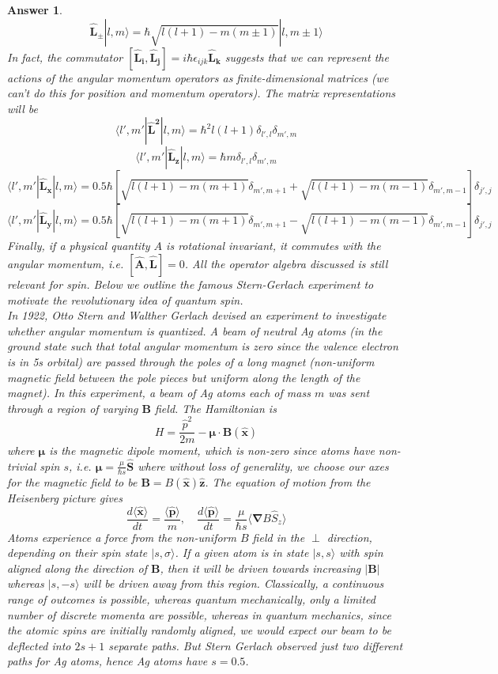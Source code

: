 \documentclass[a4paper]{article}
\newtheorem{ans}{Answer}[subsection]
\theoremstyle{new}
\begin{document}
\begin{ans}
$$\mathbf{\hat{L}_\pm}|l,m\rangle=\hbar\sqrt{l(l+1)-m(m\pm1)}|l,m\pm1\rangle$$
In fact, the commutator $[\mathbf{\hat{L}_i},\mathbf{\hat{L}_j}]=i\hbar\epsilon_{ijk}\mathbf{\hat{L}_k}$ suggests that we can represent the actions of the angular momentum operators as finite-dimensional matrices (we can't do this for position and momentum operators). The matrix representations will be $$\langle l',m'|\mathbf{\hat{L}^2}|l,m\rangle=\hbar^2l(l+1)\delta_{l',l}\delta_{m',m}$$
$$\langle l',m'|\mathbf{\hat{L}_z}|l,m\rangle=\hbar m\delta_{l',l}\delta_{m',m}$$
$$\langle l',m'|\mathbf{\hat{L}_x}|l,m\rangle=0.5\hbar[\sqrt{l(l+1)-m(m+1)}\delta_{m',m+1}+\sqrt{l(l+1)-m(m-1)}\delta_{m',m-1}]\delta_{j',j}$$
$$\langle l',m'|\mathbf{\hat{L}_y}|l,m\rangle=0.5\hbar[\sqrt{l(l+1)-m(m+1)}\delta_{m',m+1}-\sqrt{l(l+1)-m(m-1)}\delta_{m',m-1}]\delta_{j',j}$$
Finally, if a physical quantity $A$ is rotational invariant, it commutes with the angular momentum, i.e. $[\mathbf{\hat{A}},\mathbf{\hat{L}}]=0$. All the operator algebra discussed is still relevant for spin. Below we outline the famous Stern-Gerlach experiment to motivate the revolutionary idea of quantum spin.\\[5pt]
In 1922, Otto Stern and Walther Gerlach devised an experiment to investigate whether angular momentum is quantized. A beam of neutral Ag atoms (in the ground state such that total angular momentum is zero since the valence electron is in 5s orbital) are passed through the poles of a long magnet (non-uniform magnetic field between the pole pieces but uniform along the length of the magnet). In this experiment, a beam of Ag atoms each of mass $m$ was sent through a region of varying $\mathbf{B}$ field. The Hamiltonian is 
$$H=\frac{\hat{p}^2}{2m}-\boldsymbol{\mu}\cdot\mathbf{B}(\mathbf{\hat{x}})$$
where $\boldsymbol{\mu}$ is the magnetic dipole moment, which is non-zero since atoms have non-trivial spin $s$, i.e. $\boldsymbol{\mu}=\frac{\mu}{\hbar s}\mathbf{\hat{S}}$ where without loss of generality, we choose our axes for the magnetic field to be $\mathbf{B}=B(\mathbf{\hat{x}})\mathbf{\hat{z}}$. The equation of motion from the Heisenberg picture gives
$$\frac{d\langle\mathbf{\hat{x}}\rangle}{dt}=\frac{\langle\mathbf{\hat{p}}\rangle}{m},\quad \frac{d\langle\mathbf{\hat{p}}\rangle}{dt}=\frac{\mu}{\hbar s}\langle\boldsymbol{\nabla}B \hat{S}_z\rangle$$
Atoms experience a force from the non-uniform $B$ field in the $\perp$ direction, depending on their spin state $|s,\sigma\rangle$. If a given atom is in state $|s,s\rangle$ with spin aligned along the direction of $\mathbf{B}$, then it will be driven towards increasing $|\mathbf{B}|$ whereas $|s,-s\rangle$ will be driven away from this region. Classically, a continuous range of outcomes is possible, whereas quantum mechanically, only a limited number of discrete momenta are possible, whereas in quantum mechanics, since the atomic spins are initially randomly aligned, we would expect our beam to be deflected into $2s+1$ separate paths. But Stern Gerlach observed just two different paths for Ag atoms, hence Ag atoms have $s=0.5$.\\[5pt]

\end{ans}
\end{document}
